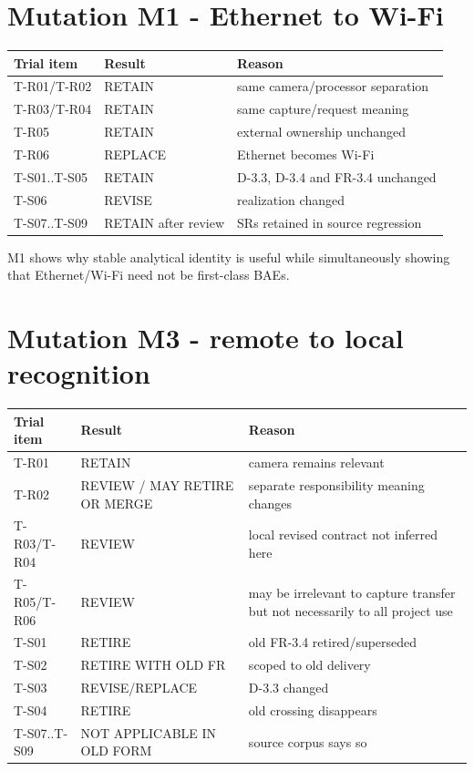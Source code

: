 \documentclass[10pt,a4paper]{article}
\begin{document}
\section{Mutation M1 - Ethernet to Wi-Fi}
\small
\begin{longtable}{p{}p{}p{}}
\toprule\textbf{Trial item} & \textbf{Result} & \textbf{Reason}\\\midrule\endhead
T-R01/T-R02 & RETAIN & same camera/processor separation\\
T-R03/T-R04 & RETAIN & same capture/request meaning\\
T-R05 & RETAIN & external ownership unchanged\\
T-R06 & REPLACE & Ethernet becomes Wi-Fi\\
T-S01..T-S05 & RETAIN & D-3.3, D-3.4 and FR-3.4 unchanged\\
T-S06 & REVISE & realization changed\\
T-S07..T-S09 & RETAIN after review & SRs retained in source regression\\
\bottomrule
\end{longtable}
\normalsize

M1 shows why stable analytical identity is useful while simultaneously showing that Ethernet/Wi-Fi need not be first-class BAEs.

\section{Mutation M3 - remote to local recognition}
\small
\begin{longtable}{p{}p{}p{}}
\toprule\textbf{Trial item} & \textbf{Result} & \textbf{Reason}\\\midrule\endhead
T-R01 & RETAIN & camera remains relevant\\
T-R02 & REVIEW / MAY RETIRE OR MERGE & separate responsibility meaning changes\\
T-R03/T-R04 & REVIEW & local revised contract not inferred here\\
T-R05/T-R06 & REVIEW & may be irrelevant to capture transfer but not necessarily to all project use\\
T-S01 & RETIRE & old FR-3.4 retired/superseded\\
T-S02 & RETIRE WITH OLD FR & scoped to old delivery\\
T-S03 & REVISE/REPLACE & D-3.3 changed\\
T-S04 & RETIRE & old crossing disappears\\
T-S07..T-S09 & NOT APPLICABLE IN OLD FORM & source corpus says so\\
\bottomrule
\end{longtable}
\normalsize
\end{document}
